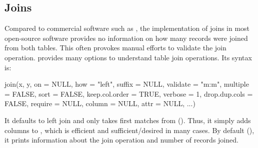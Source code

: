 \documentclass[nojss]{jss} %
\newcommand{\fct}[1]{\code{#1()}}
\begin{document}
\subsection{Joins}
%
Compared to commercial software such as  \citep{STATA}, the implementation of joins in most open-source software provides no information on how many records were joined from both tables. This often provokes manual efforts to validate the join operation. \fct{collapse::join} provides many options to understand table join operations. Its syntax is:
\begin{Code}
join(x, y, on = NULL, how = "left", suffix = NULL, validate = "m:m",
  multiple = FALSE, sort = FALSE, keep.col.order = TRUE, verbose = 1,
  drop.dup.cols = FALSE, require = NULL, column = NULL, attr = NULL, ...)
\end{Code}
It defaults to left join and only takes first matches from  (). Thus, it simply adds columns to , which is efficient and sufficient/desired in many cases. By default (), it prints information about the join operation and number of records joined. \newline
\end{document}
